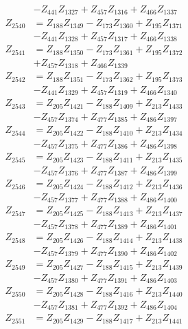\begin{multicols}{2}
\begin{align}
&- Z_{441}Z_{1327} + Z_{457}Z_{1316} + Z_{466}Z_{1337} \nonumber \\
Z_{2540} &= Z_{188}Z_{1349} - Z_{173}Z_{1360} + Z_{195}Z_{1371}  \nonumber \\
&- Z_{441}Z_{1328} + Z_{457}Z_{1317} + Z_{466}Z_{1338} \nonumber \\
Z_{2541} &= Z_{188}Z_{1350} - Z_{173}Z_{1361} + Z_{195}Z_{1372}  \nonumber \\
&+ Z_{457}Z_{1318} + Z_{466}Z_{1339} \nonumber \\
Z_{2542} &= Z_{188}Z_{1351} - Z_{173}Z_{1362} + Z_{195}Z_{1373}  \nonumber \\
&- Z_{441}Z_{1329} + Z_{457}Z_{1319} + Z_{466}Z_{1340} \nonumber \\
Z_{2543} &= Z_{205}Z_{1421} - Z_{188}Z_{1409} + Z_{213}Z_{1433}  \nonumber \\
&- Z_{457}Z_{1374} + Z_{477}Z_{1385} + Z_{486}Z_{1397} \nonumber \\
Z_{2544} &= Z_{205}Z_{1422} - Z_{188}Z_{1410} + Z_{213}Z_{1434}  \nonumber \\
&- Z_{457}Z_{1375} + Z_{477}Z_{1386} + Z_{486}Z_{1398} \nonumber \\
Z_{2545} &= Z_{205}Z_{1423} - Z_{188}Z_{1411} + Z_{213}Z_{1435}  \nonumber \\
&- Z_{457}Z_{1376} + Z_{477}Z_{1387} + Z_{486}Z_{1399} \nonumber \\
Z_{2546} &= Z_{205}Z_{1424} - Z_{188}Z_{1412} + Z_{213}Z_{1436}  \nonumber \\
&- Z_{457}Z_{1377} + Z_{477}Z_{1388} + Z_{486}Z_{1400} \nonumber \\
Z_{2547} &= Z_{205}Z_{1425} - Z_{188}Z_{1413} + Z_{213}Z_{1437}  \nonumber \\
&- Z_{457}Z_{1378} + Z_{477}Z_{1389} + Z_{486}Z_{1401} \nonumber \\
Z_{2548} &= Z_{205}Z_{1426} - Z_{188}Z_{1414} + Z_{213}Z_{1438}  \nonumber \\
&- Z_{457}Z_{1379} + Z_{477}Z_{1390} + Z_{486}Z_{1402} \nonumber \\
Z_{2549} &= Z_{205}Z_{1427} - Z_{188}Z_{1415} + Z_{213}Z_{1439}  \nonumber \\
&- Z_{457}Z_{1380} + Z_{477}Z_{1391} + Z_{486}Z_{1403} \nonumber \\
Z_{2550} &= Z_{205}Z_{1428} - Z_{188}Z_{1416} + Z_{213}Z_{1440}  \nonumber \\
&- Z_{457}Z_{1381} + Z_{477}Z_{1392} + Z_{486}Z_{1404} \nonumber \\
Z_{2551} &= Z_{205}Z_{1429} - Z_{188}Z_{1417} + Z_{213}Z_{1441}  \nonumber \\

\end{align}
\end{multicols}
